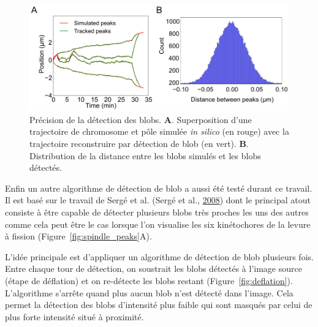 \documentclass[12pt,a4paper,twoside,openright]{book}
\begin{document}
\begin{figure}[htbp]
\centering
\includegraphics{figures/results/imaging/detection_precision.png}
\caption[Précision de la détection des blobs]{\label{fig:detection_precision}Précision
de la détection des blobs. \textbf{A}. Superposition d'une trajectoire
de chromosome et pôle simulée \emph{in silico} (en rouge) avec la
trajectoire reconstruire par détection de blob (en vert). \textbf{B}.
Distribution de la distance entre les blobs simulés et les blobs
détectés.}
\end{figure}

Enfin un autre algorithme de détection de blob a aussi été testé durant
ce travail. Il est basé sur le travail de Sergé et al. (Sergé et al.,
\protect\hyperlink{ref-Serge2008}{2008}) dont le principal atout
consiste à être capable de détecter plusieurs blobs très proches les uns
des autres comme cela peut être le cas lorsque l'on visualise les six
kinétochores de la levure à fission (Figure~\ref{fig:spindle_peaks}A).

L'idée principale est d'appliquer un algorithme de détection de blob
plusieurs fois. Entre chaque tour de détection, on soustrait les blobs
détectés à l'image source (étape de déflation) et on re-détecte les
blobs restant (Figure~\ref{fig:deflation}). L'algorithme s'arrête quand
plus aucun blob n'est détecté dans l'image. Cela permet la détection des
blobs d'intensité plus faible qui sont masqués par celui de plus forte
intensité situé à proximité.
\end{document}
